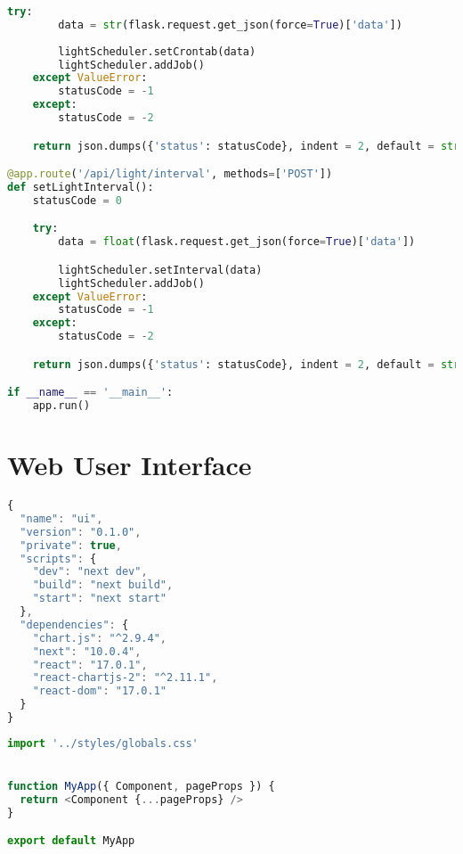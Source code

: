 \documentclass[12pt,a4paper,oneside]{book}
\begin{document}
\begin{lstlisting}[title={raspberrypi/api/data.py}, language=Python]
    try:
        data = str(flask.request.get_json(force=True)['data'])
        
        lightScheduler.setCrontab(data)
        lightScheduler.addJob()
    except ValueError:
        statusCode = -1
    except:
        statusCode = -2

    return json.dumps({'status': statusCode}, indent = 2, default = str)

@app.route('/api/light/interval', methods=['POST'])
def setLightInterval():
    statusCode = 0

    try:
        data = float(flask.request.get_json(force=True)['data'])

        lightScheduler.setInterval(data)
        lightScheduler.addJob()
    except ValueError:
        statusCode = -1
    except:
        statusCode = -2

    return json.dumps({'status': statusCode}, indent = 2, default = str)

if __name__ == '__main__':
    app.run()
\end{lstlisting}

\section{Web User Interface}
\begin{lstlisting}[title={raspberrypi/ui/package.json}, language=JavaScript]
{
  "name": "ui",
  "version": "0.1.0",
  "private": true,
  "scripts": {
    "dev": "next dev",
    "build": "next build",
    "start": "next start"
  },
  "dependencies": {
    "chart.js": "^2.9.4",
    "next": "10.0.4",
    "react": "17.0.1",
    "react-chartjs-2": "^2.11.1",
    "react-dom": "17.0.1"
  }
}
\end{lstlisting}

\bigskip

\begin{lstlisting}[title={raspberrypi/ui/pages/\_app.js}, language=JavaScript]
import '../styles/globals.css'


function MyApp({ Component, pageProps }) {
  return <Component {...pageProps} />
}

export default MyApp
\end{lstlisting}

\bigskip
\end{document}
